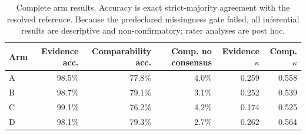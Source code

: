 \begin{table}[t]
\centering\small
\caption{Complete arm results. Accuracy is exact strict-majority agreement with the resolved reference. Because the predeclared missingness gate failed, all inferential results are descriptive and non-confirmatory; rater analyses are post hoc.}
\label{tab:v3-full-results}
\begin{tabular}{lrrrrr}
\toprule
Arm & Evidence acc. & Comparability acc. & Comp. no consensus & Evidence $\kappa$ & Comp. $\kappa$ \\
\midrule
A & 98.5\% & 77.8\% & 4.0\% & 0.259 & 0.558 \\
B & 98.7\% & 79.1\% & 3.1\% & 0.252 & 0.539 \\
C & 99.1\% & 76.2\% & 4.2\% & 0.174 & 0.525 \\
D & 98.1\% & 79.3\% & 2.7\% & 0.262 & 0.564 \\
\bottomrule
\end{tabular}
\end{table}
